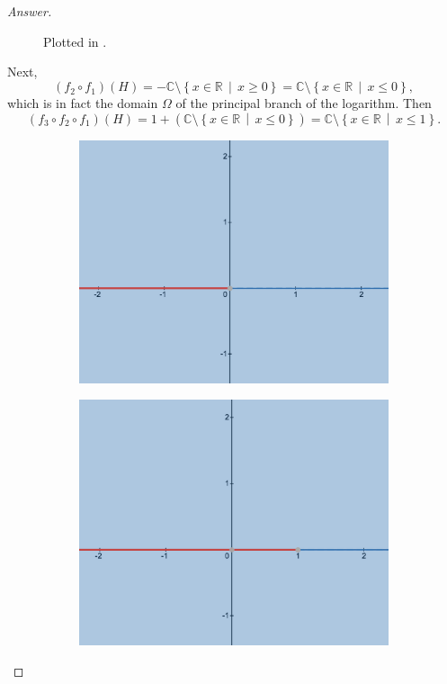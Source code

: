\documentclass[12pt]{article}
\newcommand{\cx}{\mathbb{C}}
\newcommand{\real}{\mathbb{R}}
\newcommand\paren[1]{\left( #1 \right)}
\newcommand\setb[1]{\left \{ #1 \right \}}
\theoremstyle{definition}
\begin{document}
\begin{proof}[Answer]
\begin{figure}[H]
\begin{subfigure}{0.45\textwidth}
            \label{fig:13b}
        \end{subfigure}
        \caption{Plotted in \cite{Desmos}.}
    \end{figure}
    Next, 
    \[
        \paren{ f_2 \circ f_1 }(H) = -\cx \setminus \setb{ x \in \real \, \middle| \, x \geq 0 } = \cx \setminus \setb{ x \in \real \, \middle| \, x \leq 0 } ,
    \]
    which is in fact the domain $\Omega$ of the principal branch of the logarithm. Then 
    \[
        \paren{ f_3 \circ f_2 \circ f_1 }(H) = 1 + \paren{ \cx \setminus \setb{ x \in \real \, \middle| \, x \leq 0 } } = \cx \setminus \setb{x \in \real \, \middle| \, x \leq 1 } . 
    \]
    \begin{figure}[H]
        \begin{subfigure}{0.45\textwidth}
            \centering
            \includegraphics[width=\textwidth]{13c.png}
            \subcaption{$\paren{ f_2 \circ f_1 }(H)$.}
            \label{fig:13c}
        \end{subfigure}
        \hfill
        \begin{subfigure}{0.45\textwidth}
            \centering
            \includegraphics[width=\textwidth]{13d.png}

\end{subfigure}
\end{figure}
\end{proof}
\end{document}
